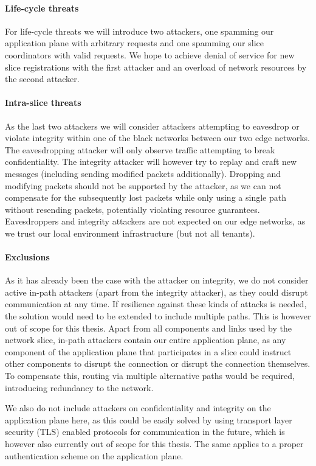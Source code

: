 \paragraph{Life-cycle threats} For life-cycle threats we will introduce two attackers, one spamming our application plane with arbitrary requests and one spamming our slice coordinators with valid requests. We hope to achieve denial of service for new slice registrations with the first attacker and an overload of network resources by the second attacker.

\paragraph{Intra-slice threats} As the last two attackers we will consider attackers attempting to eavesdrop or violate integrity within one of the black networks between our two edge networks. The eavesdropping attacker will only observe traffic attempting to break confidentiality. The integrity attacker will however try to replay and craft new messages (including sending modified packets additionally). Dropping and modifying packets should not be supported by the attacker, as we can not compensate for the subsequently lost packets while only using a single path without resending packets, potentially violating resource guarantees. Eavesdroppers and integrity attackers are not expected on our edge networks, as we trust our local environment infrastructure (but not all tenants).

\paragraph{Exclusions} As it has already been the case with the attacker on integrity, we do not consider active in-path attackers (apart from the integrity attacker), as they could disrupt communication at any time. If resilience against these kinds of attacks is needed, the solution would need to be extended to include multiple paths. This is however out of scope for this thesis. Apart from all components and links used by the network slice, in-path attackers contain our entire application plane, as any component of the application plane that participates in a slice could instruct other components to disrupt the connection or disrupt the connection themselves. To compensate this, routing via multiple alternative paths would be required, introducing redundancy to the network.

We also do not include attackers on confidentiality and integrity on the application plane here, as this could be easily solved by using transport layer security (TLS) enabled protocols for communication in the future, which is however also currently out of scope for this thesis. The same applies to a proper authentication scheme on the application plane.

